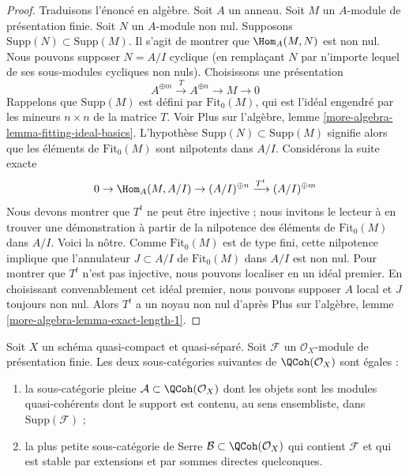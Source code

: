 \begin{proof}
Traduisons l'énoncé en algèbre. Soit $A$ un anneau. Soit $M$ un
$A$-module de présentation finie. Soit $N$ un $A$-module non nul. Supposons
$\text{Supp}(N) \subset \text{Supp}(M)$. Il s'agit de montrer que
$\Hom_A(M, N)$ est non nul.
Nous pouvons supposer $N = A/I$ cyclique (en remplaçant $N$ par n'importe
lequel de ses sous-modules cycliques non nuls). Choisissons une présentation
$$
A^{\oplus m} \xrightarrow{T} A^{\oplus n} \to M \to 0
$$
Rappelons que $\text{Supp}(M)$ est défini par $\text{Fit}_0(M)$, qui est
l'idéal engendré par les mineurs $n \times n$ de la matrice $T$.
Voir Plus sur l'algèbre, lemme
\ref{more-algebra-lemma-fitting-ideal-basics}.
L'hypothèse $\text{Supp}(N) \subset \text{Supp}(M)$ signifie alors que
les éléments de $\text{Fit}_0(M)$ sont nilpotents dans $A/I$.
Considérons la suite exacte
$$
0 \to \Hom_A(M, A/I) \to (A/I)^{\oplus n} \xrightarrow{T^t} (A/I)^{\oplus m}
$$
Nous devons montrer que $T^t$ ne peut être injective ; nous invitons le
lecteur à en trouver une démonstration à partir de la nilpotence des éléments
de $\text{Fit}_0(M)$ dans $A/I$. Voici la nôtre.
Comme $\text{Fit}_0(M)$ est de type fini, cette nilpotence implique que
l'annulateur $J \subset A/I$ de $\text{Fit}_0(M)$ dans $A/I$ est non nul.
Pour montrer que $T^t$ n'est pas injective, nous pouvons localiser en un idéal
premier. En choisissant convenablement cet idéal premier, nous pouvons
supposer $A$ local et $J$ toujours non nul. Alors $T^t$ a un noyau non nul
d'après Plus sur l'algèbre, lemme
\ref{more-algebra-lemma-exact-length-1}.
\end{proof}

\begin{lemma}
\label{lemma-supported-on-support}
Soit $X$ un schéma quasi-compact et quasi-séparé.
Soit $\mathcal{F}$ un $\mathcal{O}_X$-module de présentation finie.
Les deux sous-catégories suivantes de $\QCoh(\mathcal{O}_X)$ sont égales :
\begin{enumerate}
\item la sous-catégorie pleine $\mathcal{A} \subset \QCoh(\mathcal{O}_X)$
dont les objets sont les modules quasi-cohérents dont le support est contenu,
au sens ensembliste, dans $\text{Supp}(\mathcal{F})$ ;
\item la plus petite sous-catégorie de Serre
$\mathcal{B} \subset \QCoh(\mathcal{O}_X)$ qui contient
$\mathcal{F}$ et qui est stable par extensions et par sommes directes
quelconques.
\end{enumerate}
\end{lemma}

